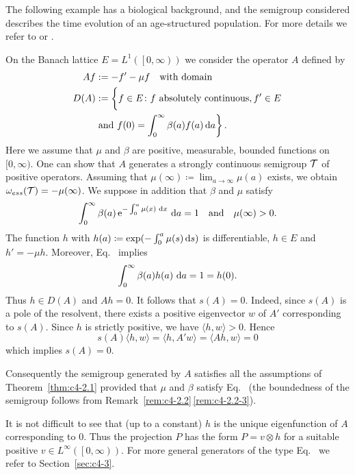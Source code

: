 The following example has a biological background, and the semigroup considered describes the time evolution of an age-structured population.
For more details we refer to \textcite{greiner:1984a} or \textcite{webb:1984}.
\begin{example}\label{ex:c4-2.3}
On the Banach lattice $E = L^{1}( \left[0,\infty\right))$ we consider the operator $A$ defined by
\begin{equation}\label{eq:c4-2.2}
\begin{split}
	Af &:= -f' - \mu f \quad \text{with domain}\\ 
	D(A) &:= \left\{ \vphantom{\int_{0}^{\infty}}f \in E \colon f \text{ absolutely continuous}, f' \in E  \right. \\
	 \qquad & \left. \text{and } f(0) = \int_{0}^{\infty} \beta(a) f(a)  \diff{a} \vphantom{\}} \right\}.
\end{split}
\end{equation}
Here we assume that $\mu$ and $\beta$ are positive, measurable, bounded functions on $[0,\infty)$.
One can show that $A$ generates a strongly continuous semigroup $\mathcal{T}$ of positive operators.
Assuming that $\mu(\infty) \coloneq \lim_{a \to \infty}\mu(a)$ exists, we obtain $\omega_{ess}(\mathcal{T}) = -\mu(\infty)$.
We suppose in addition that $\beta$ and $\mu$ satisfy
\begin{equation}\label{eq:c4-2.3}
\int_{0}^{\infty} \beta(a)\,\mathrm{e}^{-\int_{0}^{a} \mu(x)\,\mathop{}\!\mathrm{d}{x}}\,\mathop{}\!\mathrm{d}{a} = 1
\quad \text{and} \quad \mu(\infty) > 0.
\end{equation}
The function $h$ with $h(a) \coloneq \exp(-\int_{0}^{a} \mu(s) \mathop{}\!\mathrm{d}{s})$ is differentiable, $h \in E$ and $h' = -\mu h$.
Moreover, Eq.~ implies 
%
\[
	 \int_{0}^{\infty} \beta(a)h(a) \, \mathop{}\!\mathrm{d}{a} = 1 = h(0) .
\]
%
Thus $h \in D(A)$ and $Ah = 0$.
It follows that $s(A) = 0$.
Indeed, since $s(A)$ is a pole of the resolvent, there exists a positive eigenvector $w$ of\/ $A'$ corresponding to $s(A)$.
Since $h$ is strictly positive, we have $\langle h,w \rangle > 0$. 
Hence 
\[
s(A)\langle h,w \rangle = \langle h,A'w \rangle = \langle Ah,w \rangle = 0
\]
which implies $s(A) = 0$.

Consequently the semigroup generated by $A$ satisfies all the assumptions of Theorem~\ref{thm:c4-2.1} provided that $\mu$ and $\beta$ satisfy Eq.~ (the boundedness of the semigroup follows from Remark~\ref{rem:c4-2.2}\,\ref{rem:c4-2.2-3}).

It is not difficult to see that (up to a constant) $h$ is the unique eigenfunction of\/ $A$ corresponding to $0$.
Thus the projection $P$ has the form $P = v \otimes h$ for a suitable positive $v \in L^{\infty}(\left[0,\infty\right))$.
For more general generators of the type Eq.~ we refer to Section~\ref{sec:c4-3}.
\end{example}
